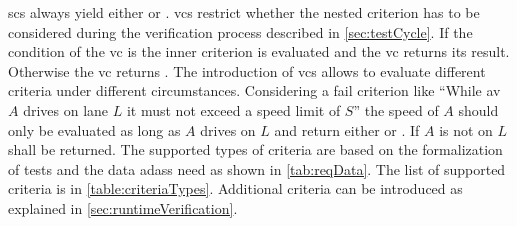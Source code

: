 \Glspl{sc} always yield either \iltrue{} or \ilfalse{}.
\Glspl{vc} restrict whether the nested criterion has to be considered during the verification process described in \autoref{sec:testCycle}.
If the condition of the \gls{vc} is \iltrue{} the inner criterion is evaluated and the \gls{vc} returns its result.
Otherwise the \gls{vc} returns \ilunknown{}.
The introduction of \glspl{vc} allows to evaluate different criteria under different circumstances.
Considering a fail criterion like ``While \gls{av} \(A\) drives on lane \(L\) it must not exceed a speed limit of \(S\)'' the speed of \(A\) should only be evaluated as long as \(A\) drives on \(L\) and return either \iltrue{} or \ilfalse{}.
If \(A\) is not on \(L\) \ilunknown{} shall be returned.
The supported types of criteria are based on the formalization of tests and the data \glspl{adas} need as shown in \autoref{tab:reqData}.
The list of supported criteria is in \autoref{table:criteriaTypes}.
Additional criteria can be introduced as explained in \autoref{sec:runtimeVerification}.\par
